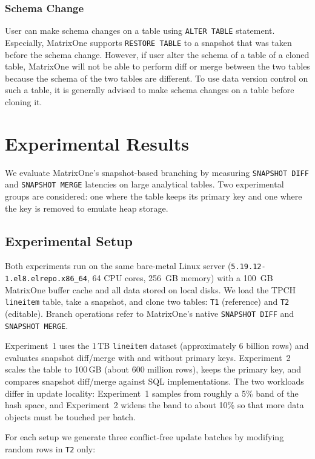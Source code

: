 \documentclass[sigconf,nonacm]{acmart} %
\begin{document}
\subsubsection{Schema Change}
User can make schema changes on a table using \texttt{ALTER TABLE} 
statement.  Especially, MatrixOne supports \texttt{RESTORE TABLE} 
to a snapshot that was taken before the schema change.  However, 
if user alter the schema of a table of a cloned table, MatrixOne
will not be able to perform diff or merge between the two tables
because the schema of the two tables are different.  To use data
version control on such a table, it is generally advised to make 
schema changes on a table before cloning it. 


\section{Experimental Results}
We evaluate MatrixOne's snapshot-based branching by measuring
\texttt{SNAPSHOT DIFF} and \texttt{SNAPSHOT MERGE} latencies on large
analytical tables.  Two experimental groups are considered: one where
the table keeps its primary key and one where the key is removed to
emulate heap storage.

\subsection{Experimental Setup}
Both experiments run on the same bare-metal Linux server
(\texttt{5.19.12-1.el8.elrepo.x86\_64}, 64 CPU cores, 256~GB memory) with
a 100~GB MatrixOne buffer cache and all data stored on local disks.  We
load the TPCH \texttt{lineitem} table, take a snapshot, and clone two
tables: \texttt{T1} (reference) and \texttt{T2} (editable).  Branch
operations refer to MatrixOne's native \texttt{SNAPSHOT DIFF} and
\texttt{SNAPSHOT MERGE}.

Experiment~1 uses the 1\,TB \texttt{lineitem} dataset (approximately
6 billion rows) and evaluates snapshot diff/merge with and without
primary keys.  Experiment~2 scales the table to 100\,GB (about 600
million rows), keeps the primary key, and compares snapshot diff/merge
against SQL implementations.  The two workloads differ in update
locality: Experiment~1 samples from roughly a 5\% band of the hash
space, and Experiment~2 widens the band to about 10\% so that more data
objects must be touched per batch.

For each setup we generate three conflict-free update batches by
modifying random rows in \texttt{T2} only:
\end{document}
